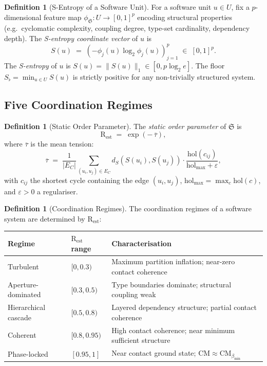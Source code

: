\documentclass[12pt,a4paper,twocolumn]{article}
\theoremstyle{plain}
\theoremstyle{definition}
\newtheorem{definition}[theorem]{Definition}
\theoremstyle{remark}
\newcommand{\CM}{\mathrm{CM}}
\newcommand{\bmin}{\beta_{\min}}
\newcommand{\Scoord}{S}
\newcommand{\dS}{d_S}
\newcommand{\Rest}{\mathrm{R}_{\mathrm{est}}}
\newcommand{\CMbmin}{\CM_{\bmin}}
\newcommand{\hol}{\mathrm{hol}}
\begin{document}
\begin{definition}[S-Entropy of a Software Unit]
\label{def:s-entropy-software}
For a software unit $u \in U$, fix a $p$-dimensional feature map
$\phi_\mathfrak{S} : U \to [0,1]^p$ encoding structural properties
(e.g.\ cyclomatic complexity, coupling degree, type-set cardinality,
dependency depth).  The \emph{S-entropy coordinate vector} of $u$ is
\begin{equation}
  \Scoord(u) \;=\; \left(-\phi_j(u)\log_2\phi_j(u)\right)_{j=1}^p
    \;\in\; [0,1]^p.
\end{equation}
The \emph{S-entropy} of $u$ is $S(u) = \|\Scoord(u)\|_1 \in [0, p\log_2 e]$.
The floor $S_{\flat} = \min_{u \in U} S(u)$ is strictly positive for any
non-trivially structured system.
\end{definition}

\subsection{Five Coordination Regimes}

\begin{definition}[Static Order Parameter]
\label{def:order-parameter}
The \emph{static order parameter} of $\mathfrak{S}$ is
\begin{equation}
  \Rest \;=\; \exp\!\left(-\,\overline{\tau}\right),
\end{equation}
where $\overline{\tau}$ is the mean tension:
\begin{equation}
  \overline{\tau} \;=\; \frac{1}{|E_C|} \sum_{(u_i, u_j) \in E_C}
    \dS(S(u_i), S(u_j)) \cdot \frac{\hol(c_{ij})}{\hol_{\max} + \varepsilon},
\end{equation}
with $c_{ij}$ the shortest cycle containing the edge $(u_i,u_j)$,
$\hol_{\max} = \max_c \hol(c)$, and $\varepsilon > 0$ a regulariser.
\end{definition}

\begin{definition}[Coordination Regimes]
\label{def:coordination-regimes}
The coordination regimes of a software system are determined by $\Rest$:

\begin{center}
\begin{tabular}{lll}
  \toprule
  Regime & $\Rest$ range & Characterisation \\
  \midrule
  Turbulent & $[0, 0.3)$
    & Maximum partition inflation; near-zero contact coherence \\
  Aperture-dominated & $[0.3, 0.5)$
    & Type boundaries dominate; structural coupling weak \\
  Hierarchical cascade & $[0.5, 0.8)$
    & Layered dependency structure; partial contact coherence \\
  Coherent & $[0.8, 0.95)$
    & High contact coherence; near minimum sufficient structure \\
  Phase-locked & $[0.95, 1]$
    & Near contact ground state; $\CM \approx \CMbmin$ \\
  \bottomrule
\end{tabular}
\end{center}
\end{definition}
\end{document}
